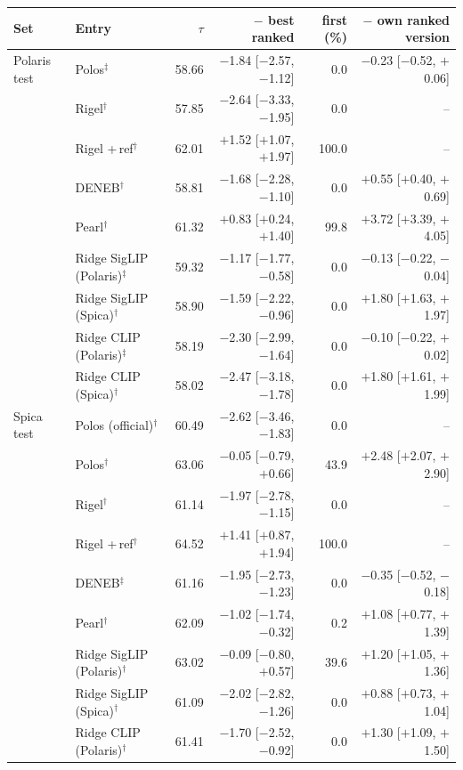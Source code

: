 \begin{tabular}{llrrrr}
\toprule
Set & Entry & $\tau$ & $-$ best ranked & first (\%) & $-$ own ranked version \\
\midrule
Polaris test & Polos$^{\ddagger}$ & 58.66 & $-$1.84 [$-$2.57, $-$1.12] & 0.0 & $-$0.23 [$-$0.52, $+$0.06] \\
 & Rigel$^{\dagger}$ & 57.85 & $-$2.64 [$-$3.33, $-$1.95] & 0.0 & -- \\
 & Rigel +\,ref$^{\dagger}$ & 62.01 & $+$1.52 [$+$1.07, $+$1.97] & 100.0 & -- \\
 & DENEB$^{\dagger}$ & 58.81 & $-$1.68 [$-$2.28, $-$1.10] & 0.0 & $+$0.55 [$+$0.40, $+$0.69] \\
 & Pearl$^{\dagger}$ & 61.32 & $+$0.83 [$+$0.24, $+$1.40] & 99.8 & $+$3.72 [$+$3.39, $+$4.05] \\
 & Ridge SigLIP (Polaris)$^{\ddagger}$ & 59.32 & $-$1.17 [$-$1.77, $-$0.58] & 0.0 & $-$0.13 [$-$0.22, $-$0.04] \\
 & Ridge SigLIP (Spica)$^{\dagger}$ & 58.90 & $-$1.59 [$-$2.22, $-$0.96] & 0.0 & $+$1.80 [$+$1.63, $+$1.97] \\
 & Ridge CLIP (Polaris)$^{\ddagger}$ & 58.19 & $-$2.30 [$-$2.99, $-$1.64] & 0.0 & $-$0.10 [$-$0.22, $+$0.02] \\
 & Ridge CLIP (Spica)$^{\dagger}$ & 58.02 & $-$2.47 [$-$3.18, $-$1.78] & 0.0 & $+$1.80 [$+$1.61, $+$1.99] \\
\addlinespace
Spica test & Polos (official)$^{\dagger}$ & 60.49 & $-$2.62 [$-$3.46, $-$1.83] & 0.0 & -- \\
 & Polos$^{\dagger}$ & 63.06 & $-$0.05 [$-$0.79, $+$0.66] & 43.9 & $+$2.48 [$+$2.07, $+$2.90] \\
 & Rigel$^{\dagger}$ & 61.14 & $-$1.97 [$-$2.78, $-$1.15] & 0.0 & -- \\
 & Rigel +\,ref$^{\dagger}$ & 64.52 & $+$1.41 [$+$0.87, $+$1.94] & 100.0 & -- \\
 & DENEB$^{\ddagger}$ & 61.16 & $-$1.95 [$-$2.73, $-$1.23] & 0.0 & $-$0.35 [$-$0.52, $-$0.18] \\
 & Pearl$^{\dagger}$ & 62.09 & $-$1.02 [$-$1.74, $-$0.32] & 0.2 & $+$1.08 [$+$0.77, $+$1.39] \\
 & Ridge SigLIP (Polaris)$^{\dagger}$ & 63.02 & $-$0.09 [$-$0.80, $+$0.57] & 39.6 & $+$1.20 [$+$1.05, $+$1.36] \\
 & Ridge SigLIP (Spica)$^{\dagger}$ & 61.09 & $-$2.02 [$-$2.82, $-$1.26] & 0.0 & $+$0.88 [$+$0.73, $+$1.04] \\
 & Ridge CLIP (Polaris)$^{\dagger}$ & 61.41 & $-$1.70 [$-$2.52, $-$0.92] & 0.0 & $+$1.30 [$+$1.09, $+$1.50] \\

\end{tabular}
